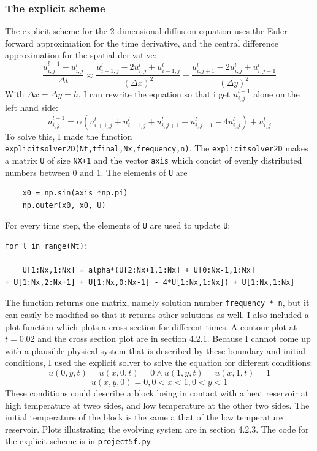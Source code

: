 \documentclass{article}
\begin{document}
\subsubsection{The explicit scheme}
The explicit scheme for the 2 dimensional diffusion equation uses the Euler forward approximation for the time derivative, and the central difference approximation for the spatial derivative:
\begin{equation*}
\frac{u_{i,j}^{l+1}-u_{i,j}^l}{\Delta t} \approx \frac{u_{i+1,j}^{l}-2u_{i,j}^{l} + u_{i-1,j}^l}{(\Delta x)^2}+\frac{u_{i,j+1}^{l}-2u_{i,j}^{l} + u_{i,j-1}^l}{(\Delta y)^2}
\end{equation*}
With $\Delta x = \Delta y = h$, I can rewrite the equation so that i get $u_{i,j}^{l+1}$ alone on the left hand side:
\begin{equation*}
u_{i,j}^{l+1} = \alpha( u_{i+1,j}^{l} + u_{i-1,j}^l + u_{i,j+1}^{l} + u_{i,j-1}^l-4u_{i,j}^{l})+u_{i,j}^l
\end{equation*}
To solve this, I made the function \texttt{explicitsolver2D(Nt,tfinal,Nx,frequency,n)}. The \texttt{explicitsolver2D} makes a matrix \texttt{U} of size \texttt{NX+1} and the vector \texttt{axis} which concist of evenly distributed numbers between 0 and 1. The elements of \texttt{U} are 
\begin{verbatim}
	x0 = np.sin(axis *np.pi)
	np.outer(x0, x0, U)
\end{verbatim}

For every time step, the elements of \texttt{U} are used to update \texttt{U}:
\begin{verbatim}
for l in range(Nt):

    U[1:Nx,1:Nx] = alpha*(U[2:Nx+1,1:Nx] + U[0:Nx-1,1:Nx]
+ U[1:Nx,2:Nx+1] + U[1:Nx,0:Nx-1] - 4*U[1:Nx,1:Nx]) + U[1:Nx,1:Nx]
\end{verbatim}

The function returns one matrix, namely solution number \texttt{frequency * n}, but it can easily be modified so that it returns other solutions as well. I also included a plot function which plots a cross section for different times. A contour plot at $t=0.02$ and the cross section plot are in section 4.2.1. 
Because I cannot come up with a plausible physical system that is described by these boundary and initial conditions, I used the explicit solver to solve the equation for different conditions:
$$
u(0,y,t)=u(x,0,t)=0 \wedge
u(1,y,t) =u(x,1,t) =1 
$$$$
u(x,y,0) = 0 , 0<x<1, 0<y<1
$$
These conditions could describe a block being in contact with a heat reservoir at high temperature at tweo sides, and low temperature at the other two sides. The initial temperature of the block is the same a that of the low temperature reservoir.  Plots illustrating the evolving system are in section 4.2.3.
The code for the explicit scheme is in \texttt{project5f.py}
\end{document}
